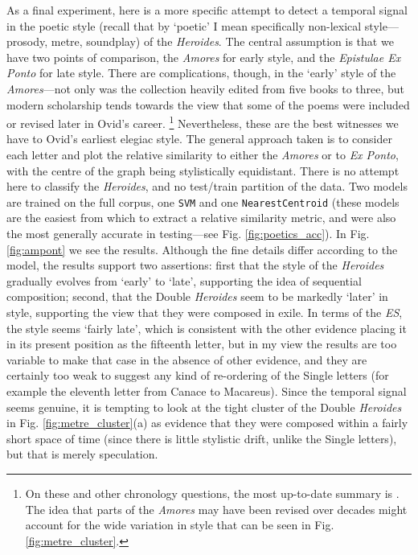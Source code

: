 \documentclass[twocolumn, switch, a4paper]{article} %
\begin{document}
As a final experiment, here is a more specific attempt to detect a temporal
signal in the poetic style (recall that by `poetic' I mean specifically
non-lexical style---prosody, metre, soundplay\textellipsis) of the
\emph{Heroides}. The central assumption is that we have two points of
comparison, the \emph{Amores} for early style, and the \emph{Epistulae Ex
Ponto} for late style. There are complications, though, in the `early' style
of the \emph{Amores}---not only was the collection heavily edited from five
books to three, but modern scholarship tends towards the view that some of the
poems were included or revised later in Ovid's career.%
%
    \footnote{On these and other chronology questions, the most up-to-date
    summary is . The idea that parts of the
    \emph{Amores} may have been revised over decades might account for the
    wide variation in style that can be seen in Fig. \ref{fig:metre_cluster}.}
%
Nevertheless, these are the best witnesses we have to Ovid's earliest elegiac
style. The general approach taken is to consider each letter and plot the
relative similarity to either the \emph{Amores} or to \emph{Ex Ponto}, with
the centre of the graph being stylistically equidistant. There is no attempt
here to classify the \emph{Heroides}, and no test/train partition of the data.
Two models are trained on the full corpus, one \texttt{SVM} and one
\texttt{NearestCentroid} (these models are the easiest from which to extract a
relative similarity metric, and were also the most generally accurate in
testing---see Fig. \ref{fig:poetics_acc}). In Fig. \ref{fig:ampont} we see the
results. Although the fine details differ according to the model, the results
support two assertions: first that the style of the \emph{Heroides} gradually
evolves from `early' to `late', supporting the idea of sequential composition;
second, that the Double \emph{Heroides} seem to be markedly `later' in style,
supporting the view that they were composed in exile. In terms of the
\emph{ES}, the style seems `fairly late', which is consistent with the other
evidence placing it in its present position as the fifteenth letter, but in my
view the results are too variable to make that case in the absence of other
evidence, and they are certainly too weak to suggest any kind of re-ordering
of the Single letters (for example the eleventh letter from Canace to
Macareus). Since the temporal signal seems genuine, it is tempting to look at
the tight cluster of the Double \emph{Heroides} in Fig.
\ref{fig:metre_cluster}(a) as evidence that they were composed within a fairly
short space of time (since there is little stylistic drift, unlike the Single
letters), but that is merely speculation.
\end{document}
